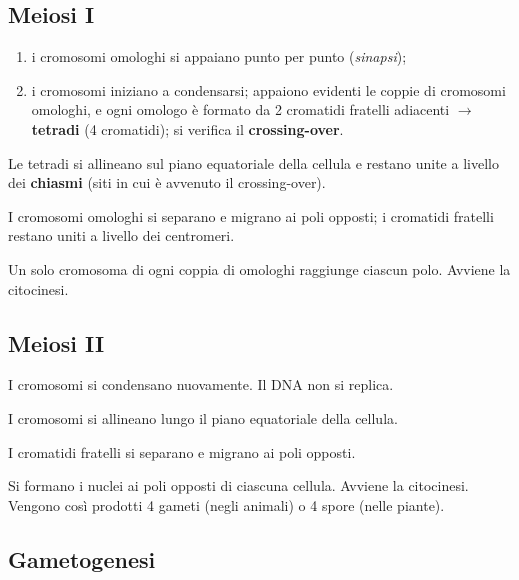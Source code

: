 \subsection{Meiosi I}

\begin{enumerate}
  \item i cromosomi omologhi si appaiano punto per punto (\textit{sinapsi});
  \item i cromosomi iniziano a condensarsi; appaiono evidenti le coppie di cromosomi omologhi, e ogni omologo è formato da 2 cromatidi fratelli adiacenti $\rightarrow$ \textbf{tetradi} (4 cromatidi); si verifica il \textbf{crossing-over}.
\end{enumerate}

Le tetradi si allineano sul piano equatoriale della cellula e restano unite a livello dei \textbf{chiasmi} (siti in cui è avvenuto il crossing-over).

I cromosomi omologhi si separano e migrano ai poli opposti; i cromatidi fratelli restano uniti a livello dei centromeri.

Un solo cromosoma di ogni coppia di omologhi raggiunge ciascun polo. Avviene la citocinesi.

\subsection{Meiosi II}

I cromosomi si condensano nuovamente. Il DNA non si replica.

I cromosomi si allineano lungo il piano equatoriale della cellula.

I cromatidi fratelli si separano e migrano ai poli opposti.

Si formano i nuclei ai poli opposti di ciascuna cellula. Avviene la citocinesi. Vengono così prodotti 4 gameti (negli animali) o 4 spore (nelle piante).

\subsection{Gametogenesi}

